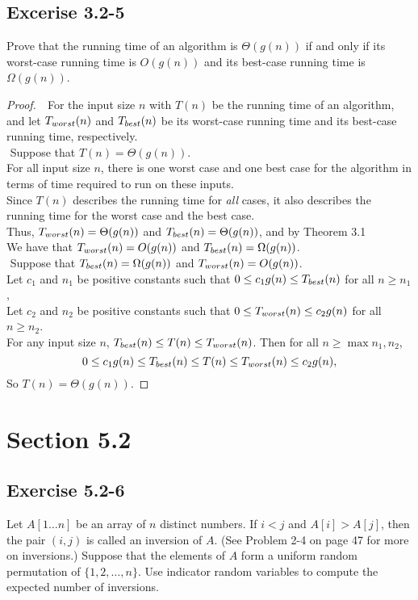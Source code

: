 \documentclass{article}
\begin{document}
\subsection*{Excerise 3.2-5}
Prove that the running time of an algorithm is $ \Theta(g(n)) $ if and only if its worst-case
running time is $ O(g(n)) $ and its best-case running time is $ \Omega(g(n)) $.
\begin{proof}
    $ $\newline
    $ $\newline
    For the input size $n$ with $T(n)$ be the running time of an algorithm, 
    and let $T_{worst}(n)$ and $T_{best}(n)$ be its worst-case running time and its best-case running time, respectively. \\
    $ $\newline
    Suppose that $T(n)=\Theta(g(n))$. \\
    For all input size $n$, there is one worst case and one best case for the algorithm 
    in terms of time required to run on these inputs. \\
    Since $T(n)$ describes the running time for \emph{all} cases, it also describes the 
    running time for the worst case and the best case. \\
    Thus, $T_{worst}(n)=\Theta(g(n))$ and $T_{best}(n)=\Theta(g(n))$, and by Theorem 3.1 \\
    We have that $T_{worst}(n)=O(g(n))$ and $T_{best}(n)=\Omega(g(n))$. \\
    $ $\newline
    Suppose that $T_{best}(n)=\Omega(g(n))$ and $T_{worst}(n)=O(g(n))$. \\
    Let $c_1$ and $n_1$ be positive constants such that $0\le c_1g(n)\le T_{best}(n)$ for all $n\ge n_1$, \\
    Let $c_2$ and $n_2$ be positive constants such that $0\le T_{worst}(n)\le c_2g(n)$ for all $n\ge n_2$. \\
    For any input size $n$, $T_{best}(n)\le T(n)\le T_{worst}(n)$.
    Then for all $n\ge\max{n_1,n_2}$,
    \[
        0 \le c_1g(n) \le T_{best}(n) \le T(n) \le T_{worst}(n) \le c_2g(n),
    \]
    So $T(n)=\Theta(g(n))$.
\end{proof}

\clearpage %

\section*{Section 5.2}
\subsection*{Exercise 5.2-6}
Let $A[1 \ldots n]$ be an array of $n$ distinct numbers. If $i < j$ and $A[i] > A[j]$, 
then the pair $(i, j)$ is called an inversion of $A$. 
(See Problem 2-4 on page 47 for more on inversions.) 
Suppose that the elements of $A$ form a uniform random permutation of $\{1, 2, \ldots, n\}$. 
Use indicator random variables to compute the expected number of inversions.
\end{document}
